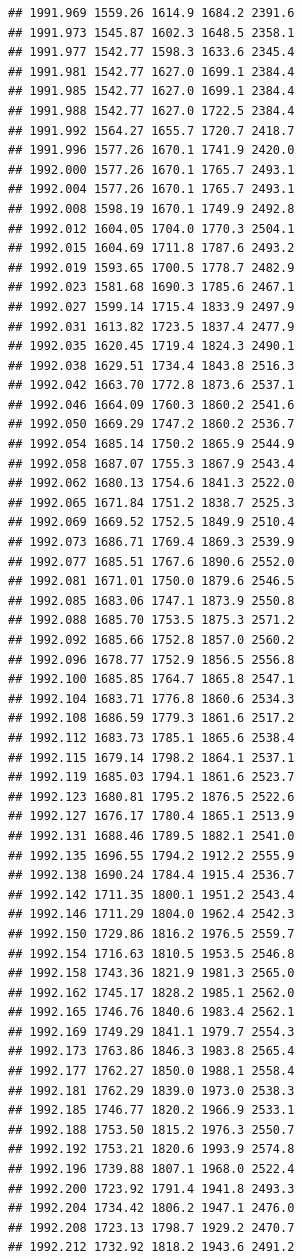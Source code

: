 \documentclass[
]{book}
\begin{document}
\begin{verbatim}
## 1991.969 1559.26 1614.9 1684.2 2391.6
## 1991.973 1545.87 1602.3 1648.5 2358.1
## 1991.977 1542.77 1598.3 1633.6 2345.4
## 1991.981 1542.77 1627.0 1699.1 2384.4
## 1991.985 1542.77 1627.0 1699.1 2384.4
## 1991.988 1542.77 1627.0 1722.5 2384.4
## 1991.992 1564.27 1655.7 1720.7 2418.7
## 1991.996 1577.26 1670.1 1741.9 2420.0
## 1992.000 1577.26 1670.1 1765.7 2493.1
## 1992.004 1577.26 1670.1 1765.7 2493.1
## 1992.008 1598.19 1670.1 1749.9 2492.8
## 1992.012 1604.05 1704.0 1770.3 2504.1
## 1992.015 1604.69 1711.8 1787.6 2493.2
## 1992.019 1593.65 1700.5 1778.7 2482.9
## 1992.023 1581.68 1690.3 1785.6 2467.1
## 1992.027 1599.14 1715.4 1833.9 2497.9
## 1992.031 1613.82 1723.5 1837.4 2477.9
## 1992.035 1620.45 1719.4 1824.3 2490.1
## 1992.038 1629.51 1734.4 1843.8 2516.3
## 1992.042 1663.70 1772.8 1873.6 2537.1
## 1992.046 1664.09 1760.3 1860.2 2541.6
## 1992.050 1669.29 1747.2 1860.2 2536.7
## 1992.054 1685.14 1750.2 1865.9 2544.9
## 1992.058 1687.07 1755.3 1867.9 2543.4
## 1992.062 1680.13 1754.6 1841.3 2522.0
## 1992.065 1671.84 1751.2 1838.7 2525.3
## 1992.069 1669.52 1752.5 1849.9 2510.4
## 1992.073 1686.71 1769.4 1869.3 2539.9
## 1992.077 1685.51 1767.6 1890.6 2552.0
## 1992.081 1671.01 1750.0 1879.6 2546.5
## 1992.085 1683.06 1747.1 1873.9 2550.8
## 1992.088 1685.70 1753.5 1875.3 2571.2
## 1992.092 1685.66 1752.8 1857.0 2560.2
## 1992.096 1678.77 1752.9 1856.5 2556.8
## 1992.100 1685.85 1764.7 1865.8 2547.1
## 1992.104 1683.71 1776.8 1860.6 2534.3
## 1992.108 1686.59 1779.3 1861.6 2517.2
## 1992.112 1683.73 1785.1 1865.6 2538.4
## 1992.115 1679.14 1798.2 1864.1 2537.1
## 1992.119 1685.03 1794.1 1861.6 2523.7
## 1992.123 1680.81 1795.2 1876.5 2522.6
## 1992.127 1676.17 1780.4 1865.1 2513.9
## 1992.131 1688.46 1789.5 1882.1 2541.0
## 1992.135 1696.55 1794.2 1912.2 2555.9
## 1992.138 1690.24 1784.4 1915.4 2536.7
## 1992.142 1711.35 1800.1 1951.2 2543.4
## 1992.146 1711.29 1804.0 1962.4 2542.3
## 1992.150 1729.86 1816.2 1976.5 2559.7
## 1992.154 1716.63 1810.5 1953.5 2546.8
## 1992.158 1743.36 1821.9 1981.3 2565.0
## 1992.162 1745.17 1828.2 1985.1 2562.0
## 1992.165 1746.76 1840.6 1983.4 2562.1
## 1992.169 1749.29 1841.1 1979.7 2554.3
## 1992.173 1763.86 1846.3 1983.8 2565.4
## 1992.177 1762.27 1850.0 1988.1 2558.4
## 1992.181 1762.29 1839.0 1973.0 2538.3
## 1992.185 1746.77 1820.2 1966.9 2533.1
## 1992.188 1753.50 1815.2 1976.3 2550.7
## 1992.192 1753.21 1820.6 1993.9 2574.8
## 1992.196 1739.88 1807.1 1968.0 2522.4
## 1992.200 1723.92 1791.4 1941.8 2493.3
## 1992.204 1734.42 1806.2 1947.1 2476.0
## 1992.208 1723.13 1798.7 1929.2 2470.7
## 1992.212 1732.92 1818.2 1943.6 2491.2

\end{verbatim}
\end{document}
